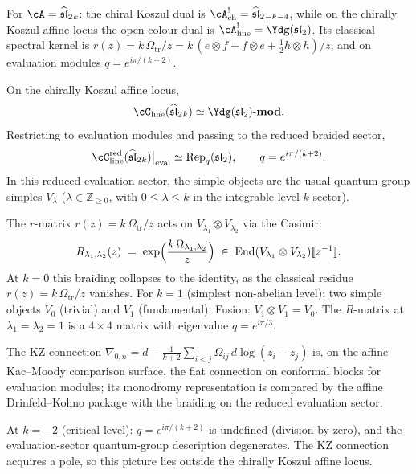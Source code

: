 For $\cA=\widehat{\mathfrak{sl}}_2{}_k$:
the chiral Koszul dual is
$\cA^!_{\mathrm{ch}}=\widehat{\mathfrak{sl}}_2{}_{-k-4}$,
while on the chirally Koszul affine locus the open-colour dual is
$\cA^!_{\mathrm{line}}=\Ydg(\mathfrak{sl}_2)$. Its classical
spectral kernel is
$r(z)=k\,\Omega_{\mathrm{tr}}/z=k\,(e\otimes f+f\otimes e+\tfrac12 h\otimes h)/z$,
and on evaluation modules
$q=e^{i\pi/(k+2)}$.

\begin{computation}
\label{comp:line-op-sl2}
On the chirally Koszul affine locus,
\[
\cC_{\mathrm{line}}(\widehat{\mathfrak{sl}}_2{}_k)
\simeq \Ydg(\mathfrak{sl}_2)\text{-}\mathbf{mod}.
\]
Restricting to evaluation modules and passing to the reduced braided
sector,
\[
\cC_{\mathrm{line}}^{\mathrm{red}}(\widehat{\mathfrak{sl}}_2{}_k)
\big|_{\mathrm{eval}}
\simeq \operatorname{Rep}_q(\mathfrak{sl}_2),
\qquad q=e^{i\pi/(k+2)}.
\]
In this reduced evaluation sector, the simple objects are the usual
quantum-group simples $V_\lambda$ ($\lambda\in\mathbb Z_{\ge 0}$,
with $0\le \lambda\le k$ in the integrable level-$k$ sector).

The $r$-matrix $r(z)=k\,\Omega_{\mathrm{tr}}/z$ acts on
$V_{\lambda_1}\otimes V_{\lambda_2}$ via the Casimir:
\[
R_{\lambda_1,\lambda_2}(z)
\;=\;
\exp\Bigl(\frac{k\,\Omega_{\lambda_1,\lambda_2}}{z}\Bigr)
\;\in\;
\operatorname{End}(V_{\lambda_1}\otimes V_{\lambda_2})
[\![z^{-1}]\!].
\]
At $k=0$ this braiding collapses to the identity, as the
classical residue $r(z)=k\,\Omega_{\mathrm{tr}}/z$ vanishes.
For $k=1$ (simplest non-abelian level): two simple objects
$V_0$ (trivial) and $V_1$ (fundamental). Fusion:
$V_1\otimes V_1=V_0$. The $R$-matrix at $\lambda_1=\lambda_2=1$
is a $4\times 4$ matrix with eigenvalue $q=e^{i\pi/3}$.

The KZ connection
$\nabla_{0,n}=d-\frac{1}{k+2}\sum_{i<j}\Omega_{ij}\,
d\log(z_i-z_j)$
is, on the affine Kac--Moody comparison surface, the flat
connection on conformal blocks for evaluation modules; its
monodromy representation is compared by the affine
Drinfeld--Kohno package with the braiding on the reduced
evaluation sector.

At $k=-2$ (critical level): $q=e^{i\pi/(k+2)}$ is undefined
(division by zero), and the evaluation-sector quantum-group
description degenerates. The KZ connection acquires a pole,
so this picture lies outside the chirally Koszul affine locus.
\end{computation}


